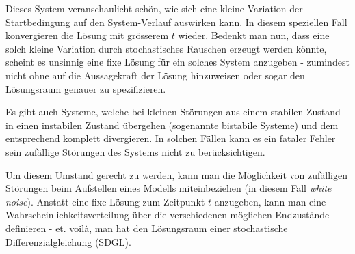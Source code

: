 Dieses System veranschaulicht schön, wie sich eine kleine Variation der Startbedingung auf den System-Verlauf auswirken kann. In diesem speziellen Fall konvergieren die Lösung mit grösserem $t$ wieder. Bedenkt man nun, dass eine solch kleine Variation durch stochastisches Rauschen erzeugt werden könnte, scheint es unsinnig eine fixe Lösung für ein solches System anzugeben - zumindest nicht ohne auf die Aussagekraft der Lösung hinzuweisen oder sogar den Lösungsraum genauer zu spezifizieren.


Es gibt auch Systeme, welche bei kleinen Störungen aus einem stabilen Zustand in einen instabilen Zustand übergehen (sogenannte bistabile Systeme) und dem entsprechend komplett divergieren. In solchen Fällen kann es ein fataler Fehler sein zufällige Störungen des Systems nicht zu berücksichtigen.


Um diesem Umstand gerecht zu werden, kann man die Möglichkeit von zufälligen Störungen beim Aufstellen eines Modells miteinbeziehen (in diesem Fall \textit{white noise}). Anstatt eine fixe Lösung zum Zeitpunkt $ t $ anzugeben, kann man eine Wahrscheinlichkeitsverteilung über die verschiedenen möglichen Endzustände definieren - et. voilà, man hat den Lösungsraum einer stochastische Differenzialgleichung (SDGL).
